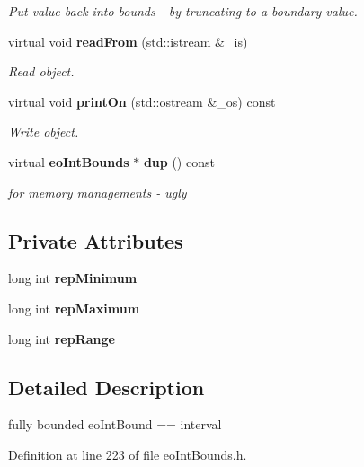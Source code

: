 \begin{CompactItemize}
\begin{CompactList}\small\item\em Put value back into bounds - by truncating to a boundary value. \item\end{CompactList}\item 
virtual void {\bf read\-From} (std::istream \&\_\-is)
\begin{CompactList}\small\item\em Read object. \item\end{CompactList}\item 
virtual void {\bf print\-On} (std::ostream \&\_\-os) const 
\begin{CompactList}\small\item\em Write object. \item\end{CompactList}\item 
virtual {\bf eo\-Int\-Bounds} $\ast$ {\bf dup} () const \label{classeo_int_interval_a16}

\begin{CompactList}\small\item\em for memory managements - ugly \item\end{CompactList}\end{CompactItemize}
\subsection*{Private Attributes}
\begin{CompactItemize}
\item 
long int {\bf rep\-Minimum}\label{classeo_int_interval_r0}

\item 
long int {\bf rep\-Maximum}\label{classeo_int_interval_r1}

\item 
long int {\bf rep\-Range}\label{classeo_int_interval_r2}

\end{CompactItemize}


\subsection{Detailed Description}
fully bounded eo\-Int\-Bound == interval 



Definition at line 223 of file eo\-Int\-Bounds.h.

